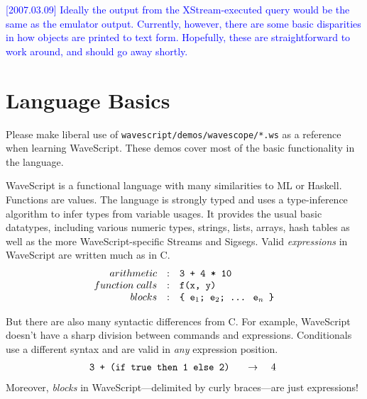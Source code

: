 \documentclass[twocolumn]{report}
\newcommand{\rednote}[1]{{\textcolor{blue}{#1}}}
\newcommand{\evalsto}[2]{\[ \begin{array}{rcl}
$\tt #1 $&$ \arr $&$ #2 $
\end{array} \]}
\newcommand{\arr}{\ensuremath{\rightarrow}}
\begin{document}
\rednote{[2007.03.09] Ideally the output from the XStream-executed
query would be the same as the emulator output.  Currently, however, there are
some basic disparities in how objects are printed to text form.  Hopefully, these
are straightforward to work around, and should go away shortly.}








\chapter{Language Basics}

Please make liberal use of {\tt wavescript/demos/wavescope/*.ws} as a reference
when learning WaveScript.  These demos cover most of the basic
functionality in the language.


WaveScript is a functional language with many similarities to ML or
Haskell.  Functions are values.  The language is strongly typed and uses a
type-inference algorithm to infer types from variable usages.
It provides the usual basic datatypes, including various
numeric types, strings, lists, arrays, hash tables as well as the more
WaveScript-specific Streams and Sigsegs.  Valid {\em expressions} in
WaveScript are written much as in C.
\[
\begin{array}{rcl}
arithmetic       & : & $\tt 3 + 4 * 10 $  \\
function\; calls & : & $\tt f(x, y)$  \\
blocks           & : & $\tt \{ e$_1$; e$_2$; \ldots$\:$ e$_n$ \}$  \\
\end{array}
\]

But there are also many syntactic differences from C.  For example,
WaveScript doesn't have a sharp division between commands and
expressions.  Conditionals use a different syntax and are valid in
{\em any}
expression position.
%
\evalsto{3 + (if true then 1 else 2)} {4}
%
Moreover, {\em blocks} in WaveScript---delimited by curly
braces---are just expressions!
\end{document}
